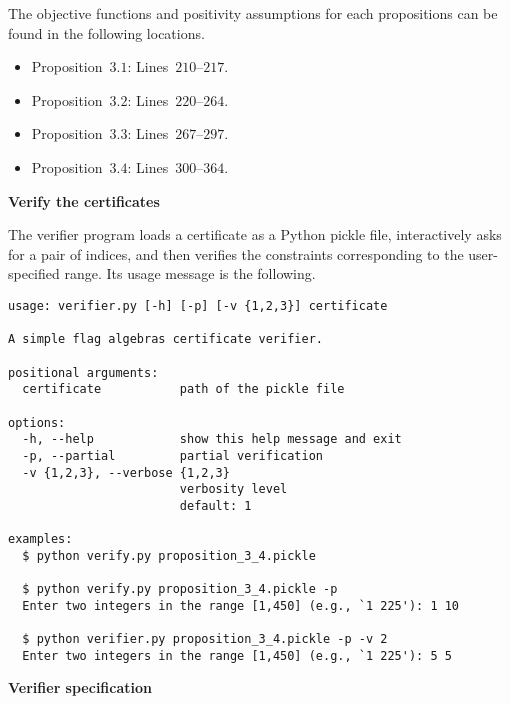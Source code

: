\documentclass[11pt,a4paper,reqno]{amsart}
\begin{document}
The objective functions and positivity assumptions for each propositions can be found
in the following locations.

\begin{itemize}
\item Proposition~$3.1$: Lines~$210$--$217$.
\item Proposition~$3.2$: Lines~$220$--$264$.
\item Proposition~$3.3$: Lines~$267$--$297$.
\item Proposition~$3.4$: Lines~$300$--$364$.
\end{itemize}

\textbf{\large Verify the certificates}

The verifier program loads a certificate as a Python pickle file, interactively asks
for a pair of indices, and then verifies the constraints corresponding to the
user-specified range. Its usage message is the following.

\begin{Verbatim}[frame=single, fontsize=\small]
usage: verifier.py [-h] [-p] [-v {1,2,3}] certificate

A simple flag algebras certificate verifier.

positional arguments:
  certificate           path of the pickle file

options:
  -h, --help            show this help message and exit
  -p, --partial         partial verification
  -v {1,2,3}, --verbose {1,2,3}
                        verbosity level
                        default: 1

examples:
  $ python verify.py proposition_3_4.pickle

  $ python verify.py proposition_3_4.pickle -p
  Enter two integers in the range [1,450] (e.g., `1 225'): 1 10

  $ python verifier.py proposition_3_4.pickle -p -v 2
  Enter two integers in the range [1,450] (e.g., `1 225'): 5 5
\end{Verbatim}

\textbf{\large Verifier specification}
\end{document}
